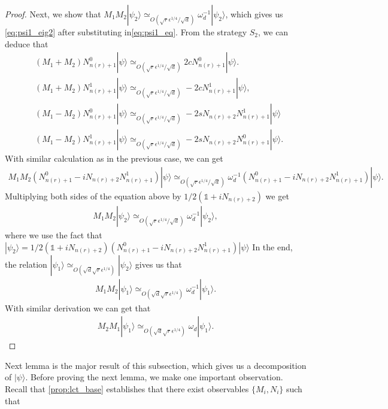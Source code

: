 \documentclass[11pt,letterpaper]{article}
\newcommand{\ket}[1]{|#1\rangle}
\newcommand{\1}{\mathbb{1}}
\newcommand{\nr}{n(r)}
\newcommand{\qe}{\epsilon^{1/4}}
\newcommand{\sd}{\sqrt{d}}
\newcommand{\sr}{\sqrt{r}}
\newcommand{\appd}[1]{\simeq_{#1}}
\theoremstyle{definition}
\begin{document}
\begin{proof}
	Next, we show that $M_1M_2 \ket{\psi_2}\appd{O(\sr \qe/\sd)} \omega_d^{-1} \ket{\psi_2}$, which gives
	us \cref{eq:psi1_eig2} after substituting in\cref{eq:psi1_eq}.
	From the strategy $S_2$, we can deduce that 
	\begin{align}
		&(M_1+M_2) N_{\nr+1}^0 \ket{\psi} \appd{O(\sr \qe/\sd)} 2c N_{\nr+1}^0 \ket{\psi}.\\
		&(M_1+M_2) N_{\nr+1}^1 \ket{\psi}  \appd{O(\sr \qe/\sd)} -2cN_{\nr+1}^1 \ket{\psi},\\
		&(M_1-M_2) N_{\nr+1}^0\ket{\psi} \appd{O(\sr\qe/\sd)}-2sN_{\nr+2} N_{\nr+1}^1\ket{\psi}\\
		&(M_1-M_2)N_{\nr+1}^1 \ket{\psi} \appd{O(\sr\qe/\sd)} -2sN_{\nr+2} N_{\nr+1}^0 \ket{\psi}.
	\end{align}
	With similar calculation as in the previous case, we can get 
	\begin{align*}
		M_1M_2 (N_{\nr+1}^0 - i N_{\nr+2}N_{\nr+1}^1) \ket{\psi} \appd{O(\sr \qe/\sd)} 
		\omega_d^{-1} (N_{\nr+1}^0 - i N_{\nr+2}N_{\nr+1}^1)\ket{\psi} .
	\end{align*}
	Multiplying both sides of the equation above by $1/2(\1+iN_{\nr+2})$ we get
	\begin{align}
		M_1M_2 \ket{\psi_2} \appd{O(\sr \qe/\sd)} \omega_d^{-1}\ket{\psi_2},
	\end{align}
	where we use the fact that $\ket{\psi_2} = 1/2(\1+iN_{\nr+2})(N_{\nr+1}^0 - i N_{\nr+2}N_{\nr+1}^1) \ket{\psi}$
	In the end, the relation $\ket{\psi_1}  \appd{O(\sd \sr\qe)} \ket{\psi_2}$ gives us that 
	\begin{align}
		M_1M_2 \ket{\psi_1} \appd{O(\sd \sr \qe)} \omega_d^{-1}\ket{\psi_1}.
	\end{align}
	With similar derivation we can get that 
	\begin{align}
	    M_2M_1 \ket{\psi_1} \appd{O(\sd \sr \qe)} \omega_d\ket{\psi_1}.
	\end{align}
\end{proof}
Next lemma is the major result of this subsection, which gives us a decomposition of $\ket{\psi}$.
Before proving the next lemma, we make one important observation.
Recall that \cref{prop:lct_base} establishes that there exist observables $\{M_i, N_i\}$ such that 
\end{document}
